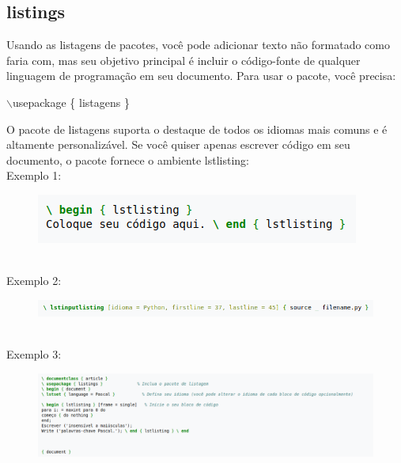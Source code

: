 \documentclass[12pt]{article}
\begin{document}
		\subsection{listings}
			Usando as listagens de pacotes, você pode adicionar texto não formatado como faria com, mas seu objetivo principal é incluir o código-fonte de qualquer linguagem de programação em seu documento. Para usar o pacote, você precisa:\\
			\begin{center}
				$\backslash$usepackage \{{ listagens }\}
			\end{center}
			O pacote de listagens suporta o destaque de todos os idiomas mais comuns e é altamente personalizável. Se você quiser apenas escrever código em seu documento, o pacote fornece o ambiente lstlisting:\\
			Exemplo 1:
			\begin{figure}[h]
				\centering
				\includegraphics[scale=0.6]{dd.png}
			\end{figure}\\
			Exemplo 2:
			\begin{figure}[h]
				\centering
				\includegraphics[scale=0.6]{py.png}
			\end{figure}\\
			Exemplo 3:
			\begin{figure}[h]
				\centering
				\includegraphics[scale=0.4]{do.png}
			\end{figure}
		
\end{document}
